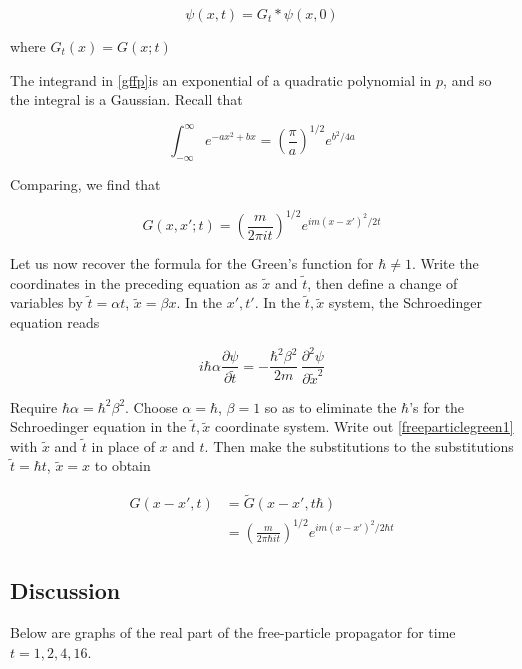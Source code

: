 \begin{equation}
\psi(x,t) = G_t*\psi(x,0)
\end{equation}

where $G_t(x) = G(x;t)$

The integrand in \eqref{gffp}is an exponential of a quadratic polynomial in $p$, and so the integral is a Gaussian.  Recall that

\begin{equation}
\int_{-\infty}^\infty e^{ -ax^2 + bx}  = \left(\frac{\pi}{a}\right)^{1/2} e^{ b^2/4a}
\end{equation}

Comparing, we find that

\begin{equation}
\label{freeparticlegreen1} G(x,x';t) = \left(\frac{m}{2\pi i t}\right)^{1/2} e^{ im(x-x')^2/2t}
\end{equation}


Let us now recover the formula for the Green's function for $\hbar \ne 1$.  Write the coordinates in the preceding equation as    $\tilde x$ and $\tilde t$, then define a change of variables by $\tilde t = \alpha t$, $\tilde x = \beta x$.  In the $x',t'$.  In the $\tilde t, \tilde x$ system, the Schroedinger equation reads

\begin{equation}
i\hbar\alpha\frac{\partial \psi}{\partial \tilde t} = -\frac{\hbar^2 \beta^2}{2m}\, \frac{\partial^2 \psi}{\partial \tilde x^2}
\end{equation}

Require $\hbar \alpha = \hbar^2\beta^2$.
Choose $\alpha = \hbar$, $\beta = 1$ so as to eliminate the $\hbar$'s for the Schroedinger equation in the $\tilde t, \tilde x$ coordinate system.  Write out \eqref{freeparticlegreen1} with $\tilde x$ and $\tilde t$ in place of $x$ and $t$.  Then make the substitutions to the substitutions $\tilde t = \hbar t$, $\tilde x = x$ to obtain

\begin{align}
G(x-x',t) &= \widetilde G\left(x-x', t\hbar \right) \\
&= \left( \frac{m}{2\pi \hbar i t} \right)^{1/2} e^{ im(x-x')^2/2\hbar t}
\end{align}

\subsection{Discussion}

Below are graphs of the real part of the free-particle propagator for time $t = 1, 2, 4,16$.


